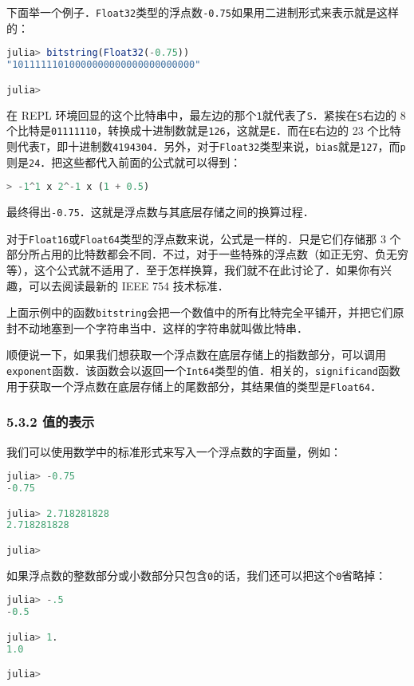 下面举一个例子．\verb|Float32|类型的浮点数\verb|-0.75|如果用二进制形式来表示就是这样的：

\begin{lstlisting}[language=julia]
julia> bitstring(Float32(-0.75))
"10111111010000000000000000000000"

julia> 
\end{lstlisting}

在 REPL 环境回显的这个比特串中，最左边的那个\verb|1|就代表了\verb|S|．紧挨在\verb|S|右边的 8 个比特是\verb|01111110|，转换成十进制数就是\verb|126|，这就是\verb|E|．而在\verb|E|右边的 23 个比特则代表\verb|T|，即十进制数\verb|4194304|．另外，对于\verb|Float32|类型来说，\verb|bias|就是\verb|127|，而\verb|p|则是\verb|24|．把这些都代入前面的公式就可以得到：
\begin{lstlisting}[language=julia]
> -1^1 x 2^-1 x (1 + 0.5)
\end{lstlisting}
最终得出\verb|-0.75|．这就是浮点数与其底层存储之间的换算过程．

对于\verb|Float16|或\verb|Float64|类型的浮点数来说，公式是一样的．只是它们存储那 3 个部分所占用的比特数都会不同．不过，对于一些特殊的浮点数（如正无穷、负无穷等），这个公式就不适用了．至于怎样换算，我们就不在此讨论了．如果你有兴趣，可以去阅读最新的 IEEE 754 技术标准．

上面示例中的函数\verb|bitstring|会把一个数值中的所有比特完全平铺开，并把它们原封不动地塞到一个字符串当中．这样的字符串就叫做比特串．

顺便说一下，如果我们想获取一个浮点数在底层存储上的指数部分，可以调用\verb|exponent|函数．该函数会以返回一个\verb|Int64|类型的值．相关的，\verb|significand|函数用于获取一个浮点数在底层存储上的尾数部分，其结果值的类型是\verb|Float64|．

\subsubsection{5.3.2 值的表示}

我们可以使用数学中的标准形式来写入一个浮点数的字面量，例如：
\begin{lstlisting}[language=julia]
julia> -0.75
-0.75

julia> 2.718281828
2.718281828

julia> 
\end{lstlisting}

如果浮点数的整数部分或小数部分只包含\verb|0|的话，我们还可以把这个\verb|0|省略掉：
\begin{lstlisting}[language=julia]
julia> -.5
-0.5

julia> 1.
1.0

julia> 
\end{lstlisting}

